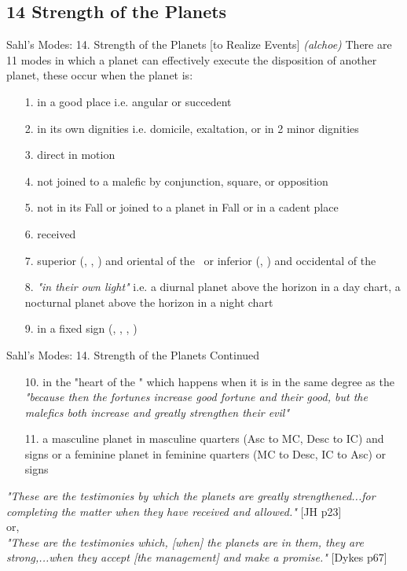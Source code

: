 \subsection{14 Strength of the Planets}
\begin{frame}[t]{Sahl's Modes: 14. Strength of the Planets [to Realize Events]}
\textsl{(alchoe)} There are 11 modes in which a planet can effectively execute the disposition of another planet, these occur when the planet is:
\begin{enumerate}
\item[1.] in a good place i.e. angular or succedent
\item[2.] in its own dignities i.e. domicile, exaltation, or in 2 minor dignities
\item[3.] direct in motion
\item[4.] not joined to a malefic by conjunction, square, or opposition
\item[5.] not in its Fall or joined to a planet in Fall or in a cadent place
\item[6.] received
\item[7.] superior (\Mars, \Jupiter, \Saturn) and oriental of the \Sun\ or inferior (\Mercury, \Venus) and occidental of the \Sun
\item[8.] \textsl{"in their own light"} i.e. a diurnal planet above the horizon in a day chart, a nocturnal planet above the horizon in a night chart
\item[9.] in a fixed sign (\Taurus, \Leo, \Scorpio, \Aquarius)
\end{enumerate}
\end{frame}
\begin{frame}[t]{Sahl's Modes: 14. Strength of the Planets Continued}
\begin{enumerate}
\item[10.] in the "heart of the \Sun" which happens when it is in the same degree as the \Sun\footnotemark[1] \textsl{"because then the fortunes increase good fortune and their good, but the malefics both increase and greatly strengthen their evil"}

\item[11.] a masculine planet in masculine quarters (Asc to MC, Desc to IC) and signs or a feminine planet in feminine quarters (MC to Desc, IC to Asc) or signs
\end{enumerate}
\textsl{"These are the testimonies by which the planets are greatly strengthened...for completing the matter when they have received and allowed."} [JH p23] \\ 
or, \\
\textsl{"These are the testimonies which, [when] the planets are in them, they are strong,...when they accept [the management] and make a promise."} [Dykes p67]


\end{frame}
